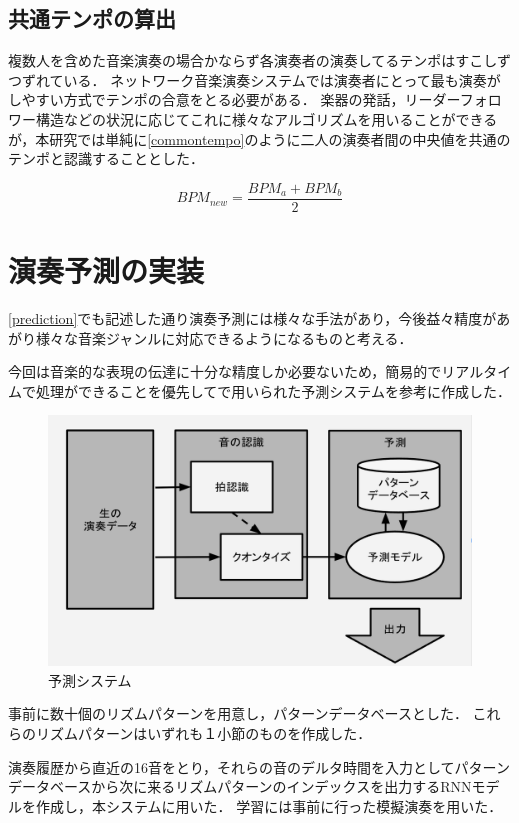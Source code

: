 \subsection{共通テンポの算出}
複数人を含めた音楽演奏の場合かならず各演奏者の演奏してるテンポはすこしずつずれている．
ネットワーク音楽演奏システムでは演奏者にとって最も演奏がしやすい方式でテンポの合意をとる必要がある．
楽器の発話，リーダーフォロワー構造などの状況に応じてこれに様々なアルゴリズムを用いることができるが，本研究では単純に\ref{commontempo}のように二人の演奏者間の中央値を共通のテンポと認識することとした．

\begin{displaymath}
  BPM_{new} = \frac{BPM_a + BPM_b}{2}
\label{commontempo}
\end{displaymath}

\section{演奏予測の実装}
\ref{prediction}でも記述した通り演奏予測には様々な手法があり，今後益々精度があがり様々な音楽ジャンルに対応できるようになるものと考える．

今回は音楽的な表現の伝達に十分な精度しか必要ないため，簡易的でリアルタイムで処理ができることを優先して\cite{tablanet}で用いられた予測システムを参考に作成した．

\begin{figure}[htbp]
  \centering
  \includegraphics[width=0.8\linewidth]{src/pred.png}
  \caption{予測システム}
  \label{fig:tablenet}
\end{figure}

事前に数十個のリズムパターンを用意し，パターンデータベースとした．
これらのリズムパターンはいずれも１小節のものを作成した．

演奏履歴から直近の16音をとり，それらの音のデルタ時間を入力としてパターンデータベースから次に来るリズムパターンのインデックスを出力するRNNモデルを作成し，本システムに用いた．
学習には事前に行った模擬演奏を用いた．

